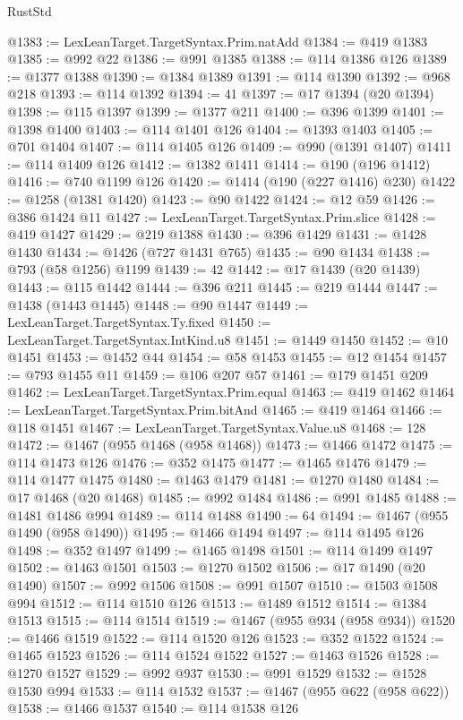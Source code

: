 \begin{lexlean}{RustStd}
\begin{coremodule}
@1383 := LexLeanTarget.TargetSyntax.Prim.natAdd
@1384 := @419 @1383
@1385 := @992 @22
@1386 := @991 @1385
@1388 := @114 @1386 @126
@1389 := @1377 @1388
@1390 := @1384 @1389
@1391 := @114 @1390
@1392 := @968 @218
@1393 := @114 @1392
@1394 := 41
@1397 := @17 @1394 (@20 @1394)
@1398 := @115 @1397
@1399 := @1377 @211
@1400 := @396 @1399
@1401 := @1398 @1400
@1403 := @114 @1401 @126
@1404 := @1393 @1403
@1405 := @701 @1404
@1407 := @114 @1405 @126
@1409 := @990 (@1391 @1407)
@1411 := @114 @1409 @126
@1412 := @1382 @1411
@1414 := @190 (@196 @1412)
@1416 := @740 @1199 @126
@1420 := @1414 (@190 (@227 @1416) @230)
@1422 := @1258 (@1381 @1420)
@1423 := @90 @1422
@1424 := @12 @59
@1426 := @386 @1424 @11
@1427 := LexLeanTarget.TargetSyntax.Prim.slice
@1428 := @419 @1427
@1429 := @219 @1388
@1430 := @396 @1429
@1431 := @1428 @1430
@1434 := @1426 (@727 @1431 @765)
@1435 := @90 @1434
@1438 := @793 (@58 @1256) @1199
@1439 := 42
@1442 := @17 @1439 (@20 @1439)
@1443 := @115 @1442
@1444 := @396 @211
@1445 := @219 @1444
@1447 := @1438 (@1443 @1445)
@1448 := @90 @1447
@1449 := LexLeanTarget.TargetSyntax.Ty.fixed
@1450 := LexLeanTarget.TargetSyntax.IntKind.u8
@1451 := @1449 @1450
@1452 := @10 @1451
@1453 := @1452 @44
@1454 := @58 @1453
@1455 := @12 @1454
@1457 := @793 @1455 @11
@1459 := @106 @207 @57
@1461 := @179 @1451 @209
@1462 := LexLeanTarget.TargetSyntax.Prim.equal
@1463 := @419 @1462
@1464 := LexLeanTarget.TargetSyntax.Prim.bitAnd
@1465 := @419 @1464
@1466 := @118 @1451
@1467 := LexLeanTarget.TargetSyntax.Value.u8
@1468 := 128
@1472 := @1467 (@955 @1468 (@958 @1468))
@1473 := @1466 @1472
@1475 := @114 @1473 @126
@1476 := @352 @1475
@1477 := @1465 @1476
@1479 := @114 @1477 @1475
@1480 := @1463 @1479
@1481 := @1270 @1480
@1484 := @17 @1468 (@20 @1468)
@1485 := @992 @1484
@1486 := @991 @1485
@1488 := @1481 @1486 @994
@1489 := @114 @1488
@1490 := 64
@1494 := @1467 (@955 @1490 (@958 @1490))
@1495 := @1466 @1494
@1497 := @114 @1495 @126
@1498 := @352 @1497
@1499 := @1465 @1498
@1501 := @114 @1499 @1497
@1502 := @1463 @1501
@1503 := @1270 @1502
@1506 := @17 @1490 (@20 @1490)
@1507 := @992 @1506
@1508 := @991 @1507
@1510 := @1503 @1508 @994
@1512 := @114 @1510 @126
@1513 := @1489 @1512
@1514 := @1384 @1513
@1515 := @114 @1514
@1519 := @1467 (@955 @934 (@958 @934))
@1520 := @1466 @1519
@1522 := @114 @1520 @126
@1523 := @352 @1522
@1524 := @1465 @1523
@1526 := @114 @1524 @1522
@1527 := @1463 @1526
@1528 := @1270 @1527
@1529 := @992 @937
@1530 := @991 @1529
@1532 := @1528 @1530 @994
@1533 := @114 @1532
@1537 := @1467 (@955 @622 (@958 @622))
@1538 := @1466 @1537
@1540 := @114 @1538 @126

\end{coremodule}
\end{lexlean}
